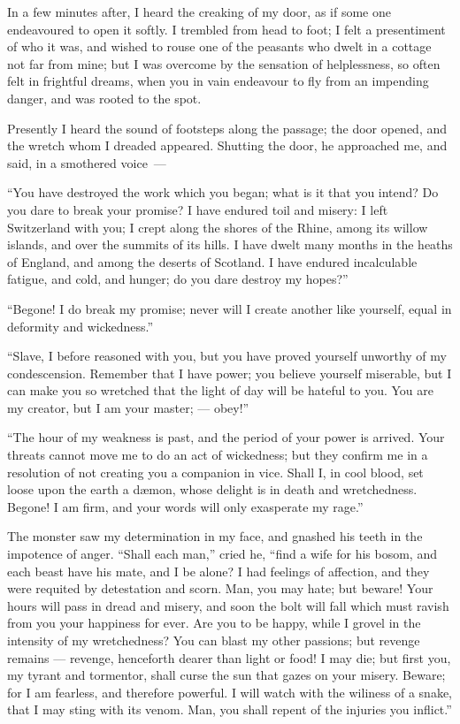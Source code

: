 In a few minutes after, I heard the
creaking of my door, as if some one
endeavoured to open it softly. I trembled
from head to foot; I felt a presentiment
of who it was, and wished to rouse
one of the peasants who dwelt in a
cottage not far from mine; but I was
overcome by the sensation of helplessness,
so often felt in frightful dreams,
when you in vain endeavour to fly from
an impending danger, and was rooted
to the spot.

Presently I heard the sound of footsteps
along the passage; the door
opened, and the wretch whom I dreaded
appeared. Shutting the door, he approached
me, and said, in a smothered
voice~---

``You have destroyed the work
which you began; what is it that you intend?
Do you dare to break your promise?
I have endured toil and misery:
I left Switzerland with you; I crept
along the shores of the Rhine, among
its willow islands, and over the summits
of its hills. I have dwelt many
months in the heaths of England, and
among the deserts of Scotland. I have
endured incalculable fatigue, and cold,
and hunger; do you dare destroy my
hopes?''

``Begone! I do break my promise;
never will I create another like yourself,
equal in deformity and wickedness.''

``Slave, I before reasoned with you,
but you have proved yourself unworthy
of my condescension. Remember that
I have power; you believe yourself
miserable, but I can make you so
wretched that the light of day will be
hateful to you. You are my creator,
but I am your master; --- obey!''

``The hour of my weakness is past,
and the period of your power is arrived.
Your threats cannot move me
to do an act of wickedness; but they
confirm me in a resolution of not
creating you a companion in vice.
Shall I, in cool blood, set loose upon
the earth a dæmon, whose delight is
in death and wretchedness. Begone!
I am firm, and your words will only
exasperate my rage.''

The monster saw my determination
in my face, and gnashed his teeth in the
impotence of anger. ``Shall each man,''
cried he, ``find a wife for his bos\-om,
and each beast have his mate, and I be
alone? I had feelings of affection, and
they were requited by detestation and
scorn. Man, you may hate; but beware!
Your hours will pass in dread and
misery, and soon the bolt will fall
which must ravish from you your happiness
for ever. Are you to be happy,
while I grovel in the intensity of my
wretchedness? You can blast my
other passions; but revenge remains --- revenge,
henceforth dearer than light or
food! I may die; but first you, my tyrant
and tormentor, shall curse the sun that
gazes on your misery. Beware; for I
am fearless, and therefore powerful. I
will watch with the wiliness of a snake,
that I may sting with its venom. Man,
you shall repent of the injuries you
inflict.''

